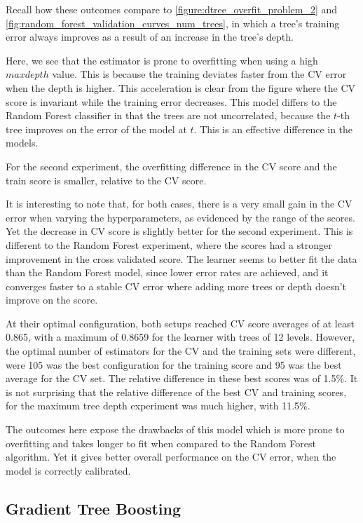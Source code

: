 Recall how these outcomes compare to \cref{figure:dtree_overfit_problem_2} and \cref{fig:random_forest_validation_curves_num_trees},
in which a tree's training error always improves as a result of an increase in the tree's depth.

Here, we see that the estimator is prone to overfitting when using a high $max depth$ value.
This is because the training deviates faster from the CV error when the depth is higher.
This acceleration is clear from the figure where the CV score is invariant while the training error decreases.
This model differs to the Random Forest classifier in that the trees are not uncorrelated, because the $t$-th tree improves on the error of the model at $t$.
This is an effective difference in the models.

For the second experiment, the overfitting difference in the CV score and the train score is smaller, relative to the CV score.

It is interesting to note that, for both cases, there is a very small gain in the CV error when varying the hyperparameters, as evidenced by the range of the scores.
Yet the decrease in CV score is slightly better for the second experiment.
This is different to the Random Forest experiment, where the scores had a stronger improvement in the cross validated score.
The learner seems to better fit the data than the Random Forest model, since lower error rates are achieved, and it converges faster to a stable CV error where adding more trees or depth doesn't improve on the score.

At their optimal configuration, both setups reached CV score averages of at least 0.865, with a maximum of 0.8659 for the learner with trees of 12 levels.
However, the optimal number of estimators for the CV and the training sets were different, were 105 was the best configuration for the training score and 95 was the best average for the CV set. The relative difference in these best scores was of 1.5\%.
It is not surprising that the relative difference of the best CV and training scores, for the maximum tree depth experiment was much higher, with 11.5\%.

The outcomes here expose the drawbacks of this model which is more prone to overfitting and takes longer to fit when compared to the Random Forest algorithm.
Yet it gives better overall performance on the CV error, when the model is correctly calibrated.



\subsection{Gradient Tree Boosting}

